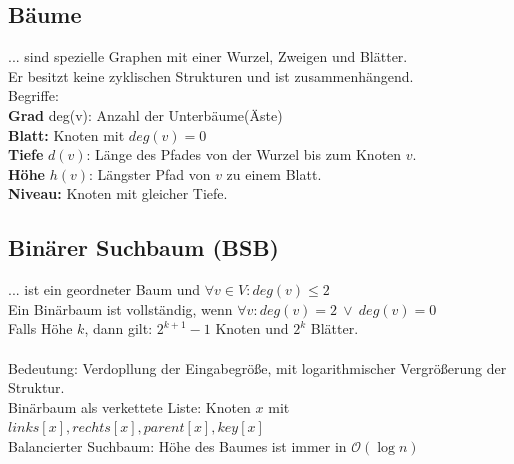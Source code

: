 \documentclass[fs, footer]{latex4ei}
\begin{document}
\begin{multicols*}{4}
{{\subsection{Bäume}
... sind spezielle Graphen mit einer Wurzel, Zweigen und Blätter.\\
Er besitzt keine zyklischen Strukturen und ist zusammenhängend.\\

Begriffe:\\
\textbf{Grad} deg(v): Anzahl der Unterbäume(Äste)\\
\textbf{Blatt:} Knoten mit $deg(v) = 0$\\
\textbf{Tiefe} $d(v)$: Länge des Pfades von der Wurzel bis zum Knoten $v$.\\ 
\textbf{Höhe} $h(v)$: Längster Pfad von $v$ zu einem Blatt.\\   
\textbf{Niveau:} Knoten mit gleicher Tiefe.\\
\subsection{Binärer Suchbaum (BSB)}
... ist ein geordneter Baum und $\forall v \in V:deg(v) \le 2$\\
Ein Binärbaum ist vollständig, wenn $\forall v: deg(v) = 2 \ \lor \ deg(v)=0$\\ 
Falls Höhe $k$, dann gilt: $2^{k+1} - 1$ Knoten und $2^k$ Blätter.\\ 
\\
Bedeutung: Verdopllung der Eingabegröße, mit logarithmischer Vergrößerung der Struktur.\\
Binärbaum als verkettete Liste: Knoten $x$ mit $links[x],rechts[x], parent[x], key[x]$\\

Balancierter Suchbaum: Höhe des Baumes ist immer in $\mathcal O(\log n)$\\
}}
\end{multicols*}
\end{document}
